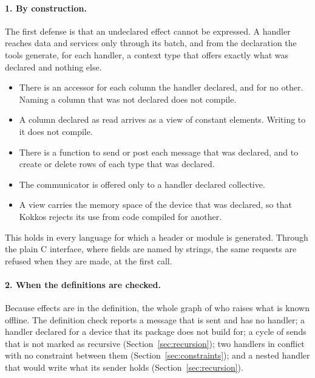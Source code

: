 \documentclass[11pt,a4paper]{article}
\begin{document}
\paragraph{1. By construction.}  The first defense is that an undeclared
effect cannot be expressed.  A handler reaches data and services only
through its batch, and from the declaration the tools generate, for each
handler, a context type that offers exactly what was declared and nothing
else.

\begin{itemize}
  \item There is an accessor for each column the handler declared, and for
        no other.  Naming a column that was not declared does not compile.
  \item A column declared as read arrives as a view of constant elements.
        Writing to it does not compile.
  \item There is a function to send or post each message that was declared,
        and to create or delete rows of each type that was declared.
  \item The communicator is offered only to a handler declared collective.
  \item A view carries the memory space of the device that was declared, so
        that Kokkos rejects its use from code compiled for another.
\end{itemize}

This holds in every language for which a header or module is generated.
Through the plain C interface, where fields are named by strings, the same
requests are refused when they are made, at the first call.

\paragraph{2. When the definitions are checked.}  Because effects are in the
definition, the whole graph of who raises what is known offline.  The
definition check reports a message that is sent and has no handler; a
handler declared for a device that its package does not build for; a cycle
of sends that is not marked as recursive (Section~\ref{sec:recursion}); two
handlers in conflict with no constraint between them
(Section~\ref{sec:constraints}); and a nested handler that would write what
its sender holds (Section~\ref{sec:recursion}).
\end{document}
